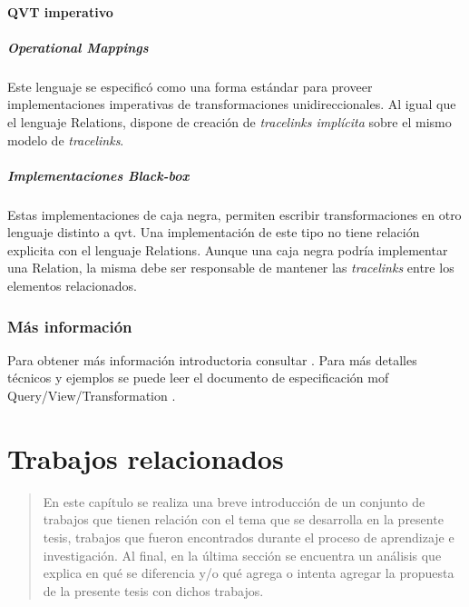 \documentclass[a4paper,12pt,oneside,spanish]{book}
\begin{document}
\subsubsection{QVT imperativo}


\paragraph{Operational Mappings}

Este lenguaje se especificó como una forma estándar para proveer implementaciones imperativas de transformaciones unidireccionales. Al igual que el lenguaje \textsf{Relations}, dispone de creación de \textit{tracelinks implícita} sobre el mismo modelo de \textit{tracelinks}.


\paragraph{Implementaciones Black-box}

Estas implementaciones de caja negra, permiten escribir transformaciones en otro lenguaje distinto a \gls{qvt}. Una implementación de este tipo no tiene relación explicita con el lenguaje \textsf{Relations}. Aunque una caja negra podría implementar una \textsf{Relation}, la misma debe ser responsable de mantener las \textit{tracelinks} entre los elementos relacionados.


\subsection{Más información}

Para obtener más información introductoria consultar \cite{DSDPM}. Para más detalles técnicos y ejemplos se puede leer el documento de especificación \gls{mof} Query/View/Transformation \cite{QVT}.




\chapter{Trabajos relacionados}

\begin{quotation}
En este capítulo se realiza una breve introducción de un conjunto de trabajos que tienen relación con el tema que se desarrolla en la presente tesis, trabajos que fueron encontrados durante el proceso de aprendizaje e investigación. Al final, en la última sección se encuentra un análisis que explica en qué se diferencia y/o qué agrega o intenta agregar la propuesta de la presente tesis con dichos trabajos.
\end{quotation}
\end{document}
